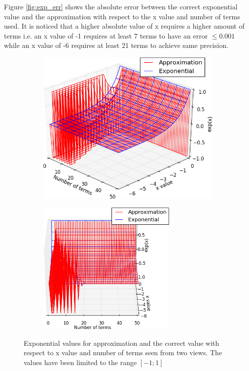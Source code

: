 Figure \vref{fig:exp_err} shows the absolute error between the correct exponential value and the approximation with respect to the x value and number of terms used. It is noticed that a higher absolute value of x requires a higher amount of terms i.e. an x value of -1 requires at least 7 terms to have an error $\leq0.001$ while an x value of -6 requires at least 21 terms to achieve same precision.\\
\begin{figure}[ht!]
  \centering
  \begin{subfigure}[t]{0.50\textwidth}
    \centering\includegraphics[width=\textwidth]{figures/exp_val_wire_1.png}
  \end{subfigure}\hspace{0.5cm}
  \begin{subfigure}[t]{0.40\textwidth}
    \centering\includegraphics[height=6.5cm]{figures/exp_val_wire_2.png}
  \end{subfigure}
  \caption{Exponential values for approximation and the correct value with respect to x value and number of terms seen from two views. The values have been limited to the range $[-1;1]$\label{fig:exp_vals}}
\end{figure}

